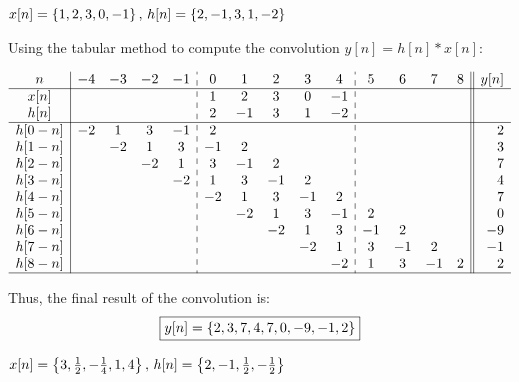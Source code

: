 \documentclass[a4paper, 10pt]{article}
\begin{document}
\begin{subproblems}[start=2]
    \item \( x[n] = \left\{ 1, 2, 3, 0, -1 \right\},\, h[n] = \left\{ 2, -1, 3, 1, -2 \right\} \)
\end{subproblems}

\begin{solution}
Using the tabular method to compute the convolution \( y[n] = h[n] * x[n] \):

\renewcommand{\arraystretch}{1.3}
\[
\begin{array}{c|cccc:ccccc:cccc||r}
n  & -4 & -3 & -2 & -1 & 0 & 1 & 2 & 3 & 4 & 5 & 6 & 7 & 8 & y[n] \\
\hline
x[n] &  &  &  &  & 1 & 2 & 3 & 0 & -1 &  &  &  &  \\
h[n] &  &  &  &  & 2 & -1 & 3 & 1 & -2 &  &  &  &  \\
\hline
h[0-n] & -2 & 1 & 3 & -1 & 2 &  &  &  &  &  &  &  &  & 2 \\
h[1-n] &  & -2 & 1 & 3 & -1 & 2 &  &  &  &  &  &  &  & 3 \\
h[2-n] &  &  & -2 & 1 & 3 & -1 & 2 &  &  &  &  &  &  & 7 \\
h[3-n] &  &  &  & -2 & 1 & 3 & -1 & 2 &  &  &  &  &  & 4 \\
h[4-n] &  &  &  &  & -2 & 1 & 3 & -1 & 2 &  &  &  &  & 7 \\
h[5-n] &  &  &  &  &  & -2 & 1 & 3 & -1 & 2 &  &  &  & 0 \\
h[6-n] &  &  &  &  &  &  & -2 & 1 & 3 & -1 & 2 &  &  & -9 \\
h[7-n] &  &  &  &  &  &  &  & -2 & 1 & 3 & -1 & 2 &  & -1 \\
h[8-n] &  &  &  &  &  &  &  &  & -2 & 1 & 3 & -1 & 2 & 2 \\
\hline
\end{array}
\]

Thus, the final result of the convolution is:
\[ \boxed{ y[n] = \left\{ 2, 3, 7, 4, 7, 0, -9, -1, 2 \right\} } \]
\end{solution}

\newpage

\begin{subproblems}[start=3]
    \item \( x[n] = \left\{ 3, \frac{1}{2}, -\frac{1}{4}, 1, 4 \right\},\, h[n] = \left\{ 2, -1, \frac{1}{2}, -\frac{1}{2} \right\} \)
\end{subproblems}
\end{document}
